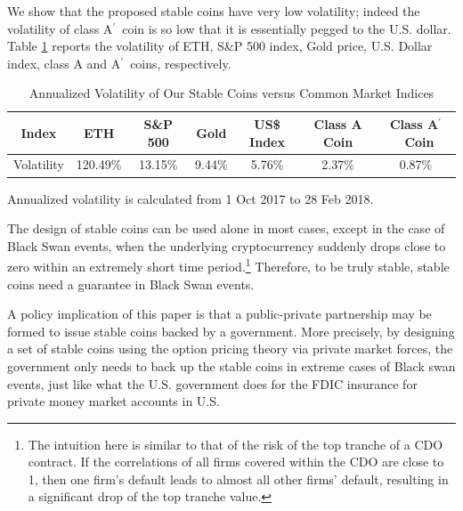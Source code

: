 \documentclass[11pt]{article}%
\numberwithin{equation}{section}
\theoremstyle{plain}
\newcommand{\Ap}{A\ensuremath{^\prime}~}
\begin{document}
We show that the proposed stable coins have very low volatility; indeed the volatility of class \Ap coin is so low that it is essentially pegged to the U.S. dollar.
Table \ref{tbl:volcomp} reports the volatility of ETH, S\&P 500 index, Gold price, U.S. Dollar index, class A and \Ap coins, respectively.

\begin{table}[!htb]
	\footnotesize
	\centering
	\caption{Annualized Volatility of Our Stable Coins versus Common Market Indices}\label{tbl:volcomp}
	\begin{tabular}{@{}c c c c c c c}
	\toprule
	Index & ETH & S\&P 500 & Gold &  US\$ Index & Class A Coin & Class \Ap Coin \\\midrule
	Volatility & 120.49\% & 13.15\% & 9.44\%  & 5.76\% & 2.37\% & 0.87\%\\
	\bottomrule
	\end{tabular}
	\vspace{0.5em}
	\par\flushleft\footnotesize Annualized volatility is calculated from 1 Oct 2017 to 28 Feb 2018.
\end{table}


The design of stable coins can be used alone in most cases, except in the case of Black Swan events, when the underlying cryptocurrency suddenly drops close to zero within an extremely short time period.\footnote{The intuition here is similar to that of the risk of the top tranche of a CDO contract. If the correlations of all firms covered within the CDO are close to 1, then one firm's default leads to almost all other firms' default, resulting in a significant drop of the top tranche value.} Therefore, to be truly stable, stable coins need a guarantee in Black Swan events.




A policy implication of this paper is that a public-private partnership may be formed to issue stable coins backed by a government. More precisely, by designing a set of stable coins using the option pricing theory via private market forces, the government only needs to back up the stable coins in extreme cases of Black swan events, just like what the U.S. government does for the FDIC insurance for private money market accounts in U.S.


\end{document}
